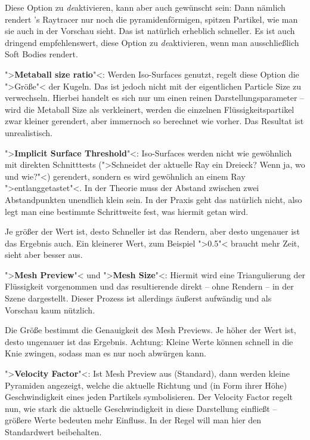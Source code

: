 \documentclass[10pt,DIV=14,a4paper]{scrartcl}
\begin{document}
	Diese Option zu \emph{de}aktivieren, kann aber auch gewünscht sein:
	Dann nämlich rendert \aoi's Raytracer nur noch die
	pyramidenförmigen, spitzen Partikel, wie man sie auch in der
	Vorschau sieht. Das ist natürlich erheblich schneller. Es ist auch
	dringend empfehlenswert, diese Option zu \emph{de}aktivieren, wenn
	man ausschließlich Soft Bodies rendert.

	\item ">\textbf{Metaball size ratio}"<: Werden Iso-Surfaces genutzt,
	regelt diese Option die ">Größe"< der Kugeln. Das ist jedoch nicht
	mit der eigentlichen Particle Size zu verwechseln. Hierbei handelt
	es sich nur um einen reinen Darstellungsparameter -- wird die
	Metaball Size als verkleinert, werden die einzelnen
	Flüssigkeitspartikel zwar kleiner gerendert, aber immernoch so
	berechnet wie vorher. Das Resultat ist unrealistisch.

	\item ">\textbf{Implicit Surface Threshold}"<: Iso-Surfaces werden
	nicht wie gewöhnlich mit direkten Schnitttests (">Schneidet der
	aktuelle Ray ein Dreieck? Wenn ja, wo und wie?"<) gerendert, sondern
	es wird gewöhnlich an einem Ray ">entlanggetastet"<. In der Theorie
	muss der Abstand zwischen zwei Abstandpunkten unendlich klein sein.
	In der Praxis geht das natürlich nicht, also legt man eine bestimmte
	Schrittweite fest, was hiermit getan wird.

	Je größer der Wert ist, desto Schneller ist das Rendern, aber desto
	ungenauer ist das Ergebnis auch. Ein kleinerer Wert, zum Beispiel
	">0.5"< braucht mehr Zeit, sieht aber besser aus.

	\item ">\textbf{Mesh Preview}"< und ">\textbf{Mesh Size}"<: Hiermit
	wird eine Triangulierung der Flüssigkeit vorgenommen und das
	resultierende \TriMesh direkt -- ohne Rendern -- in der Szene
	dargestellt. Dieser Prozess ist allerdings äußerst aufwändig und als
	Vorschau kaum nützlich.

	Die Größe bestimmt die Genauigkeit des Mesh Previews. Je höher der
	Wert ist, desto ungenauer ist das Ergebnis. Achtung: Kleine Werte
	können \aoi schnell in die Knie zwingen, sodass man es nur noch
	abwürgen kann.

	\item ">\textbf{Velocity Factor}"<: Ist Mesh Preview aus (Standard),
	dann werden kleine Pyramiden angezeigt, welche die aktuelle Richtung
	und (in Form ihrer Höhe) Geschwindigkeit eines jeden Partikels
	symbolisieren. Der Velocity Factor regelt nun, wie stark die
	aktuelle Geschwindigkeit in diese Darstellung einfließt -- größere
	Werte bedeuten mehr Einfluss. In der Regel will man hier den
	Standardwert beibehalten.
\end{document}
